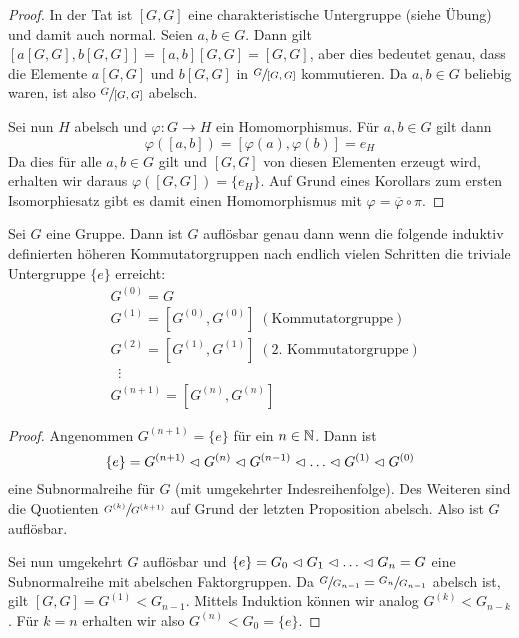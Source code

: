 \begin{proof}
	In der Tat ist $[G,G]$ eine charakteristische Untergruppe (siehe Übung) und damit auch normal.
	Seien $a,b \in G$. Dann gilt $[a [G,G], b [G,G]] = [a,b][G,G] = [G,G]$, aber dies bedeutet genau,
	dass die Elemente $a[G,G]$ und $b[G,G]$ in $\sfrac{G}{[G,G]}$ kommutieren.
	Da $a,b \in G$ beliebig waren, ist also $\sfrac{G}{[G,G]}$ abelsch.

	Sei nun $H$ abelsch und $\varphi: G \to H$ ein Homomorphismus. Für $a,b \in G$ gilt dann
	\[
		\varphi([a,b]) = [\varphi(a), \varphi(b)] = e_{H}
	\]
	Da dies für alle $a,b \in G$ gilt und $[G,G]$ von diesen Elementen erzeugt wird, erhalten wir daraus
	$\varphi([G,G]) = \{e_{H}\}$. Auf Grund eines Korollars zum ersten Isomorphiesatz gibt es damit
	einen Homomorphismus
	mit $\varphi = \overline{\varphi} \circ \pi$.
\end{proof}

\begin{proposition}
	Sei $G$ eine Gruppe. Dann ist $G$ auflösbar genau dann wenn die folgende induktiv definierten
	höheren Kommutatorgruppen nach endlich vielen Schritten die triviale Untergruppe $\{e\}$ erreicht:
	\begin{align*}
		&G^{(0)} = G \\
		&G^{(1)} = [G^{(0)}, G^{(0)}] \;(\text{Kommutatorgruppe})\\
		&G^{(2)} = [G^{(1)}, G^{(1)}] \;(\text{2. Kommutatorgruppe})\\
		&\;\;\vdots \\
		&G^{(n+1)} = [G^{(n)}, G^{(n)}]
	\end{align*}
\end{proposition}

\begin{proof}
	Angenommen $G^{(n+1)} = \{e\}$ für ein $n \in \mathbb{N}$. Dann ist
	\[
	\{e\} = G^{(n+1)} \vartriangleleft G^{(n)} \vartriangleleft G^{(n-1)} \vartriangleleft \ldots \vartriangleleft G^{(1)} \vartriangleleft G^{(0)}
	\] 
	eine Subnormalreihe für $G$ (mit umgekehrter Indesreihenfolge).
	Des Weiteren sind die Quotienten $\sfrac{G^{(k)}}{G^{(k+1)}}$ auf Grund der letzten Proposition abelsch.
	Also ist $G$ auflösbar.

	Sei nun umgekehrt $G$ auflösbar und $\{e\} = G_0 \vartriangleleft G_1 \vartriangleleft \ldots \vartriangleleft G_{n} = G$ eine Subnormalreihe mit abelschen Faktorgruppen.
	Da $\sfrac{G}{G_{n-1}} = \sfrac{G_{n}}{G_{n-1}}$ abelsch ist, gilt $[G,G] = G^{(1)} < G_{n-1}$.
	Mittels Induktion können wir analog $G^{(k)} < G_{n-k}$.
	Für $k = n$ erhalten wir also $G^{(n)} < G_0 = \{e\}$.
\end{proof}


























